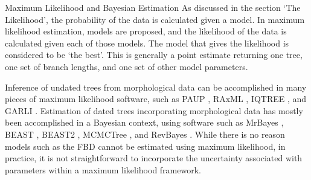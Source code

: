 \begin{boxedtext}{Maximum Likelihood and Bayesian Estimation}
As discussed in the section `The Likelihood', the probability of the data is calculated given a model. 
In maximum likelihood estimation, models are proposed, and the likelihood of the data is calculated given each of those models.
The model that gives the  likelihood is considered to be `the best'.
This is generally a point estimate returning one tree, one set of branch lengths, and one set of other model parameters.

Inference of undated trees from  morphological data can be accomplished in many pieces of maximum likelihood software, such as PAUP \citep{Swofford2003}, RAxML \citep{Stamatakis2014}, IQTREE \citep{IQtree}, and GARLI \cite{zwickl2006}.
Estimation of dated trees incorporating  morphological data has mostly been accomplished in a Bayesian context, using software such as MrBayes \cite{Huelsenbeck2002, Ronquist2003}, BEAST \citep{BEAST}, BEAST2 \citep{BEAST2} , MCMCTree \citep{MCMCtree}, and RevBayes \citep{Hoehna2014b, Hoehna2016b}.
While there is no reason models such as the FBD cannot be estimated using maximum likelihood, in practice, it is not straightforward to incorporate the uncertainty associated with parameters within a maximum likelihood framework.
\end{boxedtext}
